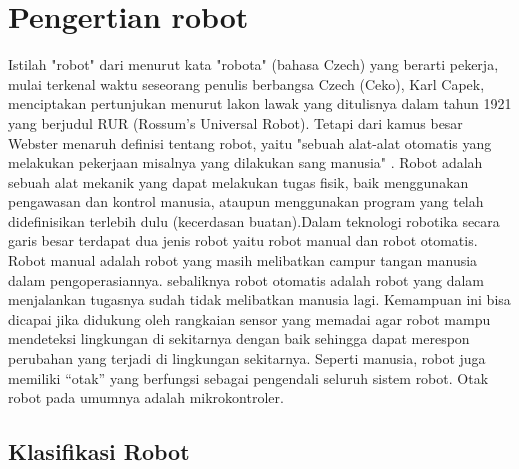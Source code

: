 \section{Pengertian robot}
Istilah "robot" dari menurut kata "robota" (bahasa Czech) yang berarti pekerja, mulai terkenal waktu seseorang penulis berbangsa Czech (Ceko), Karl Capek, menciptakan pertunjukan menurut lakon lawak yang ditulisnya dalam tahun 1921 yang berjudul RUR (Rossum’s Universal Robot). Tetapi dari kamus besar Webster menaruh definisi tentang robot, yaitu "sebuah alat-alat otomatis yang melakukan pekerjaan misalnya yang dilakukan sang manusia" \cite{indrasno2020}. Robot adalah sebuah alat mekanik yang dapat melakukan tugas fisik, baik menggunakan pengawasan dan kontrol manusia, ataupun menggunakan program yang telah didefinisikan terlebih dulu (kecerdasan buatan).Dalam teknologi robotika secara garis besar terdapat dua jenis robot yaitu robot manual dan robot otomatis. Robot manual adalah robot yang masih melibatkan campur tangan manusia dalam pengoperasiannya. sebaliknya robot otomatis adalah robot yang dalam menjalankan tugasnya sudah tidak melibatkan manusia lagi. Kemampuan ini bisa dicapai jika didukung oleh rangkaian sensor yang memadai agar robot mampu mendeteksi lingkungan di sekitarnya dengan baik sehingga dapat merespon perubahan yang terjadi di lingkungan sekitarnya. Seperti manusia, robot juga memiliki “otak” yang berfungsi sebagai pengendali seluruh sistem robot. Otak robot pada umumnya adalah mikrokontroler\cite{tobi2015}. 

\subsection{Klasifikasi Robot}
